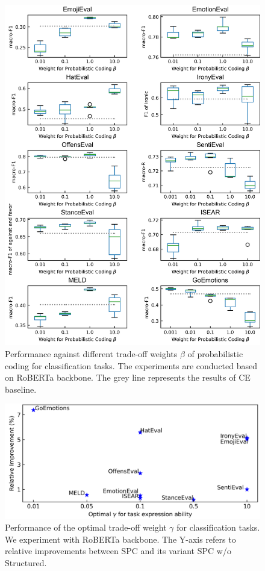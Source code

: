 \documentclass[letterpaper]{article} %
\begin{document}
\begin{figure}[!ht]
\centering
\includegraphics[width=0.98\linewidth]{figures/para_beta.png}
\caption{Performance against different trade-off weights $\beta$ of probabilistic coding for classification tasks. The experiments are conducted based on RoBERTa backbone. The grey line represents the results of CE baseline.}
\label{fig:para}
\end{figure}
\begin{figure}[!ht]
\centering
\includegraphics[width=\linewidth]{figures/para_gamma.png}
\caption{Performance of the optimal trade-off weight $\gamma$ for classification tasks. We experiment with RoBERTa backbone. The Y-axis refers to relative improvements between SPC and its variant SPC w/o Structured. }
\label{fig:para_gam}
\end{figure}
\end{document}
